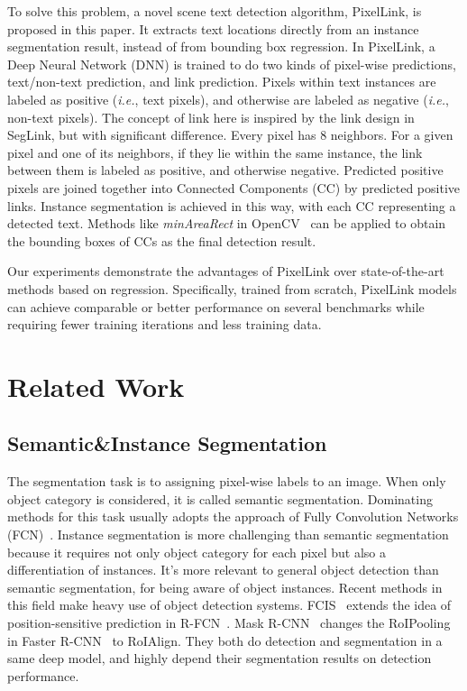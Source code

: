 \documentclass[letterpaper]{article} \usepackage{aaai18}  \usepackage{times}  \usepackage{helvet}  \usepackage{courier}  \usepackage{url}  \usepackage{graphicx}
\begin{document}
To solve this problem, a novel scene text detection algorithm, PixelLink, is proposed in this paper. It extracts text locations directly from an instance segmentation result, instead of from bounding box regression. In PixelLink, a Deep Neural Network (DNN) is trained to do two kinds of pixel-wise predictions, text/non-text prediction, and link prediction. Pixels within text instances are labeled as positive (\emph{i.e.}, text pixels), and otherwise are labeled as negative (\emph{i.e.}, non-text pixels). The concept of link here is inspired by the link design in SegLink, but with significant difference. Every pixel has 8 neighbors. For a given pixel and one of its neighbors, if they lie within the same instance, the link between them is labeled as positive, and otherwise negative. Predicted positive pixels are joined together into Connected Components (CC) by predicted positive links. Instance segmentation is achieved in this way, with each CC representing a detected text. Methods like \emph{minAreaRect} in OpenCV~\cite{opencv} can be applied to obtain the bounding boxes of CCs as the final detection result.
	
	Our experiments demonstrate the advantages of PixelLink over state-of-the-art methods based on regression. Specifically, trained from scratch, PixelLink models can achieve comparable or better performance on several benchmarks while requiring fewer training iterations and less training data.
	
	\section{Related Work}
	\subsection{Semantic\&Instance Segmentation}
	The segmentation task is to assigning pixel-wise labels to an image. When only object category is considered, it is called semantic segmentation. Dominating methods for this task usually adopts the approach of Fully Convolution Networks (FCN)~\cite{Long2015FCN}. Instance segmentation is more challenging than semantic segmentation because it requires not only object category for each pixel but also a differentiation of instances. It's more relevant to general object detection than semantic segmentation, for being aware of object instances. Recent methods in this field make heavy use of object detection systems. FCIS~\cite{Li2016FCIS} extends the idea of position-sensitive prediction in R-FCN~\cite{dai2016rfcn}. Mask R-CNN~\cite{He2017MaskRCNN} changes the RoIPooling in Faster R-CNN~\cite{Ren2017Faster} to RoIAlign. They both do detection and segmentation in a same deep model, and highly depend their segmentation results on detection performance.
	
\end{document}
